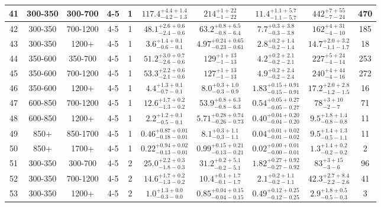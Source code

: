 \documentclass[11pt, oneside]{article}
\begin{document}
\begin{table}
{\begin{tabular}{ |c|c|c|c|c||c|c|c||c|c| }
41 & 300-350 & 300-700 & 4-5 & 1 & $117.4^{+4.4+1.4}_{-4.2-1.3}$ & $214^{+ 1+22}_{- 1-22}$ & $11.4^{+1.1+5.7}_{-1.1-5.7}$ & $442^{+ 7+55}_{- 7-24}$ & 470 \\ \hline
42 & 300-350 & 700-1200 & 4-5 & 1 & $48.1^{+2.6+0.6}_{-2.4-0.6}$ & $63.2^{+0.8+6.5}_{-0.8-6.4}$ & $7.7^{+0.3+3.8}_{-0.3-3.8}$ & $162^{+ 4+31}_{- 4-10}$ & 185 \\ \hline
43 & 300-350 & 1200+ & 4-5 & 1 & $3.6^{+1.4+0.1}_{-0.6-0.1}$ & $4.97^{+0.24+0.65}_{-0.23-0.61}$ & $2.8^{+0.2+1.4}_{-0.2-1.4}$ & $14.7^{+2.0+3.2}_{-1.1-1.7}$ & 18 \\ \hline
44 & 350-600 & 350-700 & 4-5 & 1 & $51.2^{+3.0+0.7}_{-2.6-0.6}$ & $129^{+ 1+13}_{- 1-13}$ & $4.2^{+0.2+2.1}_{-0.2-2.1}$ & $227^{+ 5+24}_{- 4-14}$ & 253 \\ \hline
45 & 350-600 & 700-1200 & 4-5 & 1 & $53.3^{+2.2+0.6}_{-2.1-0.6}$ & $127^{+ 1+13}_{- 1-13}$ & $4.9^{+0.2+2.4}_{-0.2-2.4}$ & $240^{+ 4+44}_{- 4-16}$ & 272 \\ \hline
46 & 350-600 & 1200+ & 4-5 & 1 & $4.4^{+1.3+0.1}_{-0.7-0.1}$ & $8.0^{+0.3+1.0}_{-0.3-0.9}$ & $1.83^{+0.15+0.91}_{-0.15-0.91}$ & $17.2^{+2.0+2.8}_{-1.2-1.5}$ & 16 \\ \hline
47 & 600-850 & 700-1200 & 4-5 & 1 & $12.6^{+1.7+0.2}_{-1.3-0.2}$ & $53.9^{+0.8+6.3}_{-0.8-6.3}$ & $0.54^{+0.05+0.27}_{-0.05-0.27}$ & $78^{+ 3+10}_{- 2- 7}$ & 71 \\ \hline
48 & 600-850 & 1200+ & 4-5 & 1 & $2.2^{+1.2+0.1}_{-0.5-0.1}$ & $5.71^{+0.28+0.74}_{-0.26-0.73}$ & $0.40^{+0.04+0.20}_{-0.04-0.20}$ & $9.5^{+1.8+1.4}_{-0.8-0.8}$ & 11 \\ \hline
49 & 850+ & 850-1700 & 4-5 & 1 & $0.46^{+0.87+0.01}_{-0.18-0.01}$ & $8.1^{+0.3+1.1}_{-0.3-1.1}$ & $0.04^{+0.01+0.02}_{-0.01-0.02}$ & $9.5^{+1.4+1.3}_{-0.5-1.1}$ & 11 \\ \hline
50 & 850+ & 1700+ & 4-5 & 1 & $0.22^{+0.94+0.02}_{-0.13-0.01}$ & $0.99^{+0.15+0.21}_{-0.13-0.21}$ & $0.02^{+0.00+0.01}_{-0.00-0.01}$ & $1.3^{+1.4+0.2}_{-0.2-0.2}$ & 2 \\ \hline
51 & 300-350 & 300-700 & 4-5 & 2 & $25.0^{+2.2+0.3}_{-1.8-0.3}$ & $31.2^{+0.2+5.1}_{-0.2-5.1}$ & $1.82^{+0.27+0.92}_{-0.27-0.92}$ & $83^{+ 3+15}_{- 3- 6}$ & 96 \\ \hline
52 & 300-350 & 700-1200 & 4-5 & 2 & $14.6^{+1.7+0.2}_{-1.3-0.2}$ & $10.4^{+0.1+1.7}_{-0.1-1.7}$ & $2.1^{+0.2+1.1}_{-0.2-1.1}$ & $42.3^{+2.7+8.4}_{-2.2-2.6}$ & 41 \\ \hline
53 & 300-350 & 1200+ & 4-5 & 2 & $1.0^{+1.3+0.0}_{-0.3-0.0}$ & $0.85^{+0.04+0.15}_{-0.04-0.15}$ & $0.49^{+0.12+0.25}_{-0.12-0.25}$ & $2.9^{+1.8+0.5}_{-0.5-0.3}$ & 3 \\ \hline

\end{tabular}}
\end{table}
\end{document}
